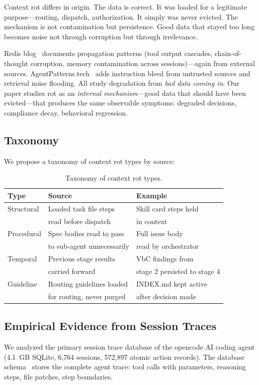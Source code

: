 \documentclass[11pt,a4paper]{article}
\begin{document}
Context rot differs in origin. The data is correct. It was loaded for a legitimate purpose---routing, dispatch, authorization. It simply was never evicted. The mechanism is not contamination but persistence. Good data that stayed too long becomes noise not through corruption but through irrelevance.

Redis blog~\cite{redis2026} documents propagation patterns (tool output cascades, chain-of-thought corruption, memory contamination across sessions)---again from external sources. AgentPatterns.tech~\cite{agentpatterns2026} adds instruction bleed from untrusted sources and retrieval noise flooding. All study degradation from \emph{bad data coming in}. Our paper studies rot as an \emph{internal mechanism}---good data that should have been evicted---that produces the same observable symptoms: degraded decisions, compliance decay, behavioral regression.

\subsection{Taxonomy}
We propose a taxonomy of context rot types by source:

\begin{table}[h]
\centering
\begin{tabular}{lll}
\toprule
\textbf{Type} & \textbf{Source} & \textbf{Example} \\
\midrule
Structural & Loaded task file steps & Skill card steps held \\
& read before dispatch & in context \\
\midrule
Procedural & Spec bodies read to pass & Full issue body \\
& to sub-agent unnecessarily & read by orchestrator \\
\midrule
Temporal & Previous stage results & VbC findings from \\
& carried forward & stage 2 persisted to stage 4 \\
\midrule
Guideline & Routing guidelines loaded & INDEX.md kept active \\
& for routing, never purged & after decision made \\
\bottomrule
\end{tabular}
\caption{Taxonomy of context rot types.}
\label{tab:taxonomy}
\end{table}

\subsection{Empirical Evidence from Session Traces}
\label{sec:empirical}
We analyzed the primary session trace database of the opencode AI coding agent (4.1~GB SQLite, 6,764 sessions, 572,897 atomic action records). The database schema~\cite{opencode2026} stores the complete agent trace: tool calls with parameters, reasoning steps, file patches, step boundaries.
\end{document}
